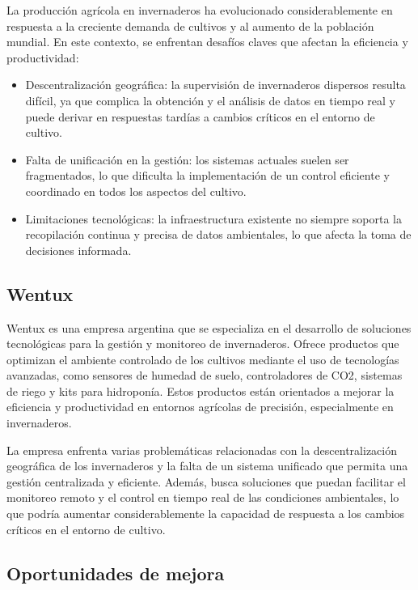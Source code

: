 La producción agrícola en invernaderos ha evolucionado considerablemente en respuesta a la creciente demanda de cultivos y al aumento de la población mundial. En este contexto, se enfrentan desafíos claves que afectan la eficiencia y productividad:

\begin{itemize}
	\item Descentralización geográfica: la supervisión de invernaderos dispersos resulta difícil, ya que complica la obtención y el análisis de datos en tiempo real y puede derivar en respuestas tardías a cambios críticos en el entorno de cultivo.
	\item Falta de unificación en la gestión: los sistemas actuales suelen ser fragmentados, lo que dificulta la implementación de un control eficiente y coordinado en todos los aspectos del cultivo.
	\item Limitaciones tecnológicas: la infraestructura existente no siempre soporta la recopilación continua y precisa de datos ambientales, lo que afecta la toma de decisiones informada.
\end{itemize}

\subsection{Wentux}

Wentux \citep{wentux} es una empresa argentina que se especializa en el desarrollo de soluciones tecnológicas para la gestión y monitoreo de invernaderos. Ofrece productos que optimizan el ambiente controlado de los cultivos mediante el uso de tecnologías avanzadas, como sensores de humedad de suelo, controladores de CO2, sistemas de riego y kits para hidroponía. Estos productos están orientados a mejorar la eficiencia y productividad en entornos agrícolas de precisión, especialmente en invernaderos.

La empresa enfrenta varias problemáticas relacionadas con la descentralización geográfica de los invernaderos y la falta de un sistema unificado que permita una gestión centralizada y eficiente. Además, busca soluciones que puedan facilitar el monitoreo remoto y el control en tiempo real de las condiciones ambientales, lo que podría aumentar considerablemente la capacidad de respuesta a los cambios críticos en el entorno de cultivo.

\subsection{Oportunidades de mejora}

